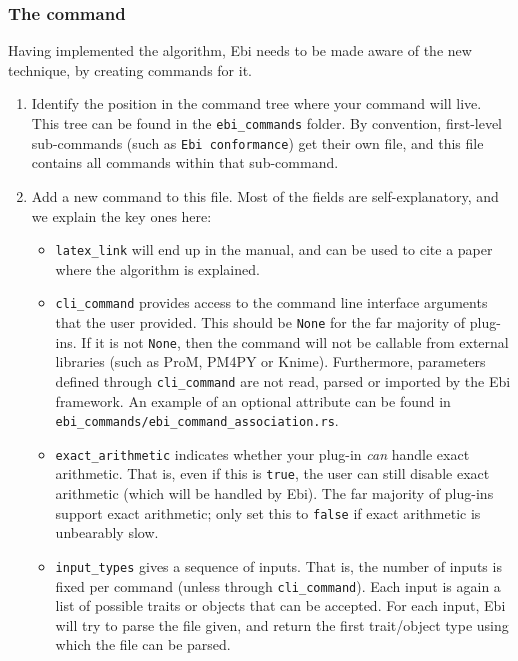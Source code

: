 \documentclass{article}
\begin{document}
		\subsubsection{The command}
			Having implemented the algorithm, Ebi needs to be made aware of the new technique, by creating commands for it.
			
			\begin{enumerate}
				\item Identify the position in the command tree where your command will live.
				This tree can be found in the \verb=ebi_commands= folder.
				By convention, first-level sub-commands (such as \verb=Ebi conformance=) get their own file, and this file contains all commands within that sub-command.
				
				\item Add a new command to this file.
				Most of the fields are self-explanatory, and we explain the key ones here:
				\begin{itemize}
					\item \verb=latex_link= will end up in the manual, and can be used to cite a paper where the algorithm is explained.
					
					\item \verb=cli_command= provides access to the command line interface arguments that the user provided.
					This should be \verb=None= for the far majority of plug-ins.
					If it is not \verb=None=, then the command will not be callable from external libraries (such as ProM, PM4PY or Knime).
					Furthermore, parameters defined through \verb=cli_command= are not read, parsed or imported by the Ebi framework.
					An example of an optional attribute can be found in \verb=ebi_commands/ebi_command_association.rs=.
					
					\item \verb=exact_arithmetic= indicates whether your plug-in \emph{can} handle exact arithmetic. 
					That is, even if this is \verb=true=, the user can still disable exact arithmetic (which will be handled by Ebi).
					The far majority of plug-ins support exact arithmetic; only set this to \verb=false= if exact arithmetic is unbearably slow.
					
					\item \verb=input_types= gives a sequence of inputs.
					That is, the number of inputs is fixed per command (unless through \verb=cli_command=).
					Each input is again a list of possible traits or objects that can be accepted.
					For each input, Ebi will try to parse the file given, and return the first trait/object type using which the file can be parsed.
					

\end{itemize}
\end{enumerate}
\end{document}
